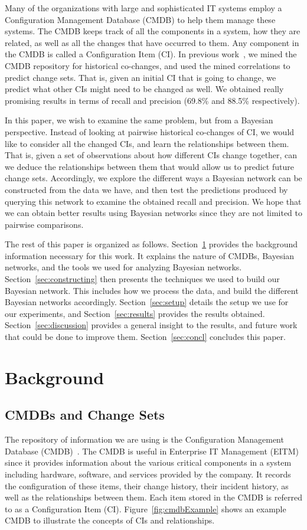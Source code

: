 \documentclass[10pt,twocolumn,letterpaper]{article}
\begin{document}
Many of the organizations with large and sophisticated IT systems employ a Configuration Management Database (CMDB) to help them manage these systems.
The CMDB keeps track of all the components in a system, how they are related, as well as all the changes that have occurred to them. Any component in the CMDB
is called a Configuration Item (CI). In previous work~\cite{nadi2010}, we mined the CMDB repository for historical co-changes, and used the mined correlations
to predict change sets. That is, given an initial CI that is going to change, we predict what other CIs might need to be changed as well. We obtained really
promising results in terms of recall and precision (69.8\% and 88.5\% respectively). 

In this paper, we wish to examine the same problem, but from a Bayesian perspective. Instead of looking at pairwise historical co-changes of CI, we would like
to consider all the changed CIs, and learn the relationships between them. That is, given a set of observations about how different CIs change
together, can we deduce the relationships between them that would allow us to predict future change sets. Accordingly, we explore the different ways a Bayesian
network can be constructed from the data we have, and then test the predictions produced by querying this network to examine the obtained recall and precision.
We hope that we can obtain better results using Bayesian networks since they are not limited to pairwise comparisons. 

The rest of this paper is organized as follows. Section~\ref{sec:bg} provides the background information necessary for this work. It explains the nature of
CMDBs, Bayesian networks, and the tools we used for analyzing Bayesian networks. Section~\ref{sec:constructing} then presents the techniques we used to build
our Bayesian network. This includes how we process the data, and build the different Bayesian networks accordingly. Section~\ref{sec:setup} details the
setup we use for our experiments, and Section~\ref{sec:results} provides the results obtained. Section~\ref{sec:discussion} provides a general insight to the
results, and future work that could be done to improve them. Section~\ref{sec:concl} concludes this paper.


\section{Background}
\label{sec:bg}

\subsection{CMDBs and Change Sets}
The repository of information we are using is the Configuration Management Database (CMDB)~\cite{itil}. The CMDB is useful in Enterprise IT Management (EITM)
since it provides information about the various critical components in a system including hardware, software, and services provided by the company. It records
the configuration of these items, their change history, their incident history, as well as the relationships between them. Each item stored in the CMDB is
referred to as a Configuration Item (CI). Figure~\ref{fig:cmdbExample} shows an example CMDB to illustrate the concepts of CIs and relationships.
\end{document}
